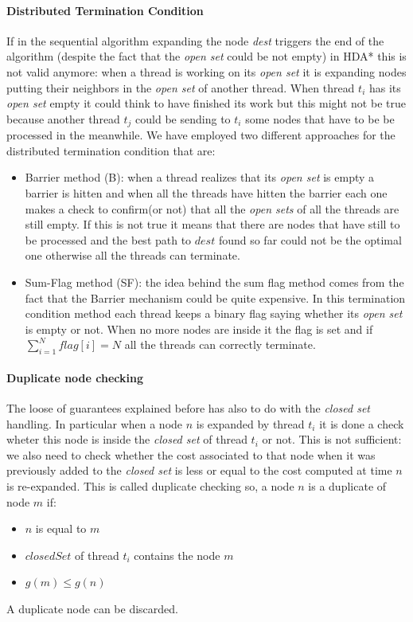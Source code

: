 \documentclass[twocolumn, switch]{article} %
\begin{document}
\paragraph{Distributed Termination Condition}
If in the sequential algorithm expanding the node \textit{dest} triggers the end of the algorithm (despite
the fact that the \textit{open set} could be not empty) in HDA* this is not valid anymore: when a thread
is working on its \textit{open set} it is expanding nodes putting their neighbors in the
\textit{open set} of another thread. When thread $t_i$ has its \textit{open set} empty it could think
to have finished its work but this might not be true because another thread $t_j$ could be sending
to $t_i$ some nodes that have to be be processed in the meanwhile. We have employed two
different approaches for the distributed termination condition that are:
\begin{itemize}
  \item Barrier method (B): when a thread realizes that its \textit{open set} is
        empty a barrier is 
        hitten and when all the threads have hitten the barrier
        each one makes a check to confirm(or not) that all the \textit{open sets} of all
        the threads are still empty. If this is not true it means that there are nodes
        that have still to be processed and the best path to $dest$ found so far could
        not be the optimal one otherwise all the threads can terminate.
  \item Sum-Flag method (SF): the idea behind the sum flag method comes from the fact that
        the Barrier mechanism could be quite expensive. In this termination condition method
        each thread keeps a binary flag saying whether its \textit{open set} is empty
        or not. When no more nodes are inside it the flag is set and if $\sum_{i=1}^{N}flag[i] = N$
        all the threads can correctly terminate.
\end{itemize}
\paragraph{Duplicate node checking}
The loose of guarantees explained before has also to do with the \textit{closed set} handling. In particular
when a node $n$ is expanded by thread $t_i$ it is done a check wheter this node is inside the \textit{closed set}
of thread $t_i$ or not. This is not sufficient: we also need to check whether the cost associated to that node 
when it was previously added to the \textit{closed set} is less or equal to the cost computed at time $n$ is re-expanded. 
This is called duplicate checking so, a node $n$ is a duplicate of node $m$ if:
\begin{itemize} 
  \item $n$ is equal to $m$
  \item $closedSet$ of thread $t_i$ contains the node $m$
  \item $g(m) \le g(n)$
\end{itemize}
A duplicate node can be discarded.
\end{document}
